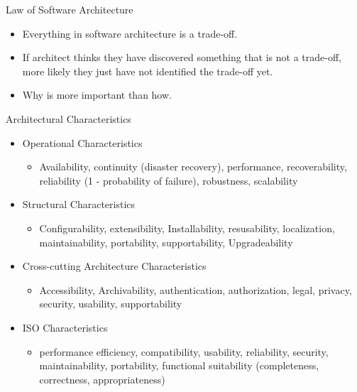 \documentclass{beamer}
\begin{document}
	\begin{frame}{Law of Software Architecture}
	\begin{itemize}
	\item Everything in software architecture is a trade-off.
	\item If architect thinks they have discovered something that is not a trade-off, more likely they just have not identified the trade-off yet.
	\item Why is more important than how.
	\end{itemize}
	\end{frame}
	
	\begin{frame}{Architectural Characteristics}
	\begin{itemize}
	\item Operational Characteristics
	\begin{itemize}
	\item Availability, continuity (disaster recovery), performance, recoverability, 
		reliability (1 - probability of failure), robustness, scalability
	\end{itemize}
	\item Structural Characteristics
	\begin{itemize}
	\item Configurability, extensibility, Installability, resusability, localization, maintainability, portability, supportability, Upgradeability
	\end{itemize}
	\item Cross-cutting Architecture Characteristics
	\begin{itemize}
	\item Accessibility, Archivability, authentication, authorization, legal, privacy, security,
	usability, supportability
	\end{itemize}
	\item ISO Characteristics
	\begin{itemize}
	\item performance efficiency, compatibility, usability, reliability, security, maintainability, portability, functional suitability (completeness, correctness, appropriateness)
	\end{itemize}
	\end{itemize}
	\end{frame}
	
\end{document}
